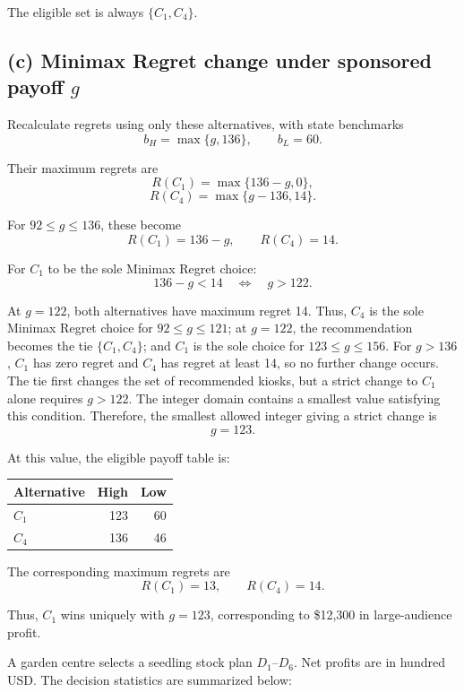 The eligible set is always $\{C_1,C_4\}$.
\secInicio[sec:q2]

\label{sol:q2c}
\subsection*{(c) Minimax Regret change under sponsored payoff $g$ }

Recalculate regrets using only these alternatives,
with state benchmarks
\[
b_H=\max\{g,136\},\qquad b_L=60.
\]

Their maximum regrets are
\[
R(C_1)=\max\{136-g,0\},
\]
\[
R(C_4)=\max\{g-136,14\}.
\]

For $92\le g\le136$, these become
\[
R(C_1)=136-g,\qquad R(C_4)=14.
\]

For $C_1$ to be the sole Minimax Regret choice:
\[
136-g<14
\quad\Longleftrightarrow\quad g>122.
\]

At $g=122$, both alternatives have maximum regret 14.
Thus, $C_4$ is the sole Minimax Regret choice for $92\le g\le121$;
at $g=122$, the recommendation becomes the tie $\{C_1,C_4\}$;
and $C_1$ is the sole choice for $123\le g\le156$.
For $g>136$, $C_1$ has zero regret and $C_4$ has regret at least 14,
so no further change occurs.
The tie first changes the set of recommended kiosks, but a strict
change to $C_1$ alone requires $g>122$.
The integer domain contains a smallest value satisfying this condition.
Therefore, the smallest allowed integer giving a strict change is
\[
\boxed{g=123}.
\]

At this value, the eligible payoff table is:

\begin{center}\small\setlength{\tabcolsep}{4pt}
\begin{tabular}{lrr}\toprule
Alternative & High & Low\\ \midrule
$C_1$ & 123 & 60\\
$C_4$ & 136 & 46\\
\bottomrule
\end{tabular}
\end{center}

The corresponding maximum regrets are
\[
R(C_1)=13,\qquad R(C_4)=14.
\]

Thus, $C_1$ wins uniquely with $g=123$,
corresponding to \$12,300 in large-audience profit.
\secInicio[sec:q2]



A garden centre selects a seedling stock plan $D_1$--$D_6$. Net profits are in hundred USD. The decision statistics are summarized below:

